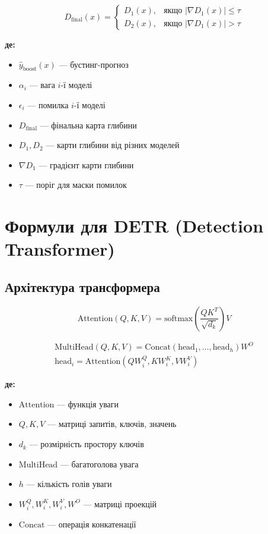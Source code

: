 \documentclass[14pt, a4paper]{extarticle}
\numberwithin{equation}{section}
\begin{document}
\begin{equation}
\boxed{D_{\text{final}}(x) = \begin{cases} 
D_1(x), & \text{якщо } |\nabla D_1(x)| \leq \tau \\ 
D_2(x), & \text{якщо } |\nabla D_1(x)| > \tau 
\end{cases}} \tag{56}
\end{equation}

\textbf{де:}
\begin{itemize}
\item $\hat{y}_{\text{boost}}(x)$ — бустинг-прогноз
\item $\alpha_i$ — вага $i$-ї моделі
\item $\epsilon_i$ — помилка $i$-ї моделі
\item $D_{\text{final}}$ — фінальна карта глибини
\item $D_1, D_2$ — карти глибини від різних моделей
\item $\nabla D_1$ — градієнт карти глибини
\item $\tau$ — поріг для маски помилок
\end{itemize}

\newpage

\section{Формули для DETR (Detection Transformer)}

\subsection{Архітектура трансформера}

\begin{equation}
\boxed{\text{Attention}(Q, K, V) = \text{softmax}\left( \frac{QK^T}{\sqrt{d_k}} \right) V} \tag{57}
\end{equation}

\begin{align}
\boxed{\text{MultiHead}(Q, K, V) = \text{Concat}(\text{head}_1, \ldots, \text{head}_h) W^O} \tag{58} \\
\text{head}_i = \text{Attention}(QW_i^Q, KW_i^K, VW_i^V) \tag{59}
\end{align}

\textbf{де:}
\begin{itemize}
\item $\text{Attention}$ — функція уваги
\item $Q, K, V$ — матриці запитів, ключів, значень
\item $d_k$ — розмірність простору ключів
\item $\text{MultiHead}$ — багатоголова увага
\item $h$ — кількість голів уваги
\item $W_i^Q, W_i^K, W_i^V, W^O$ — матриці проекцій
\item $\text{Concat}$ — операція конкатенації
\end{itemize}
\end{document}
